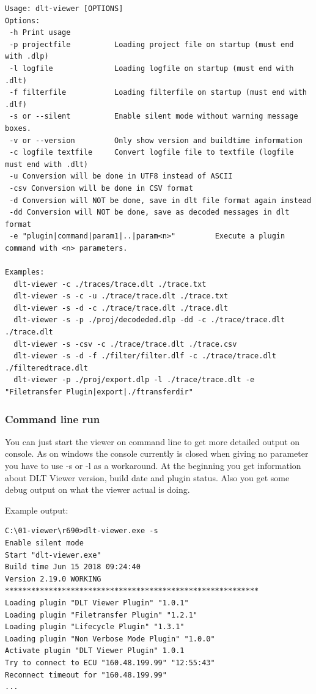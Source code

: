 \documentclass[a4paper,11pt]{article}
\begin{document}
\footnotesize\begin{verbatim}
Usage: dlt-viewer [OPTIONS]
Options:
 -h Print usage
 -p projectfile          Loading project file on startup (must end with .dlp)
 -l logfile              Loading logfile on startup (must end with .dlt)
 -f filterfile           Loading filterfile on startup (must end with .dlf)
 -s or --silent          Enable silent mode without warning message boxes.
 -v or --version         Only show version and buildtime information
 -c logfile textfile     Convert logfile file to textfile (logfile must end with .dlt)
 -u Conversion will be done in UTF8 instead of ASCII
 -csv Conversion will be done in CSV format
 -d Conversion will NOT be done, save in dlt file format again instead
 -dd Conversion will NOT be done, save as decoded messages in dlt format
 -e "plugin|command|param1|..|param<n>"         Execute a plugin command with <n> parameters.

Examples:
  dlt-viewer -c ./traces/trace.dlt ./trace.txt
  dlt-viewer -s -c -u ./trace/trace.dlt ./trace.txt
  dlt-viewer -s -d -c ./trace/trace.dlt ./trace.dlt
  dlt-viewer -s -p ./proj/decodeded.dlp -dd -c ./trace/trace.dlt ./trace.dlt
  dlt-viewer -s -csv -c ./trace/trace.dlt ./trace.csv
  dlt-viewer -s -d -f ./filter/filter.dlf -c ./trace/trace.dlt ./filteredtrace.dlt
  dlt-viewer -p ./proj/export.dlp -l ./trace/trace.dlt -e "Filetransfer Plugin|export|./ftransferdir"
\end{verbatim}
\normalsize

\subsubsection{Command line run}
You can just start the viewer on command line to get more detailed output on console.
As on windows the console currently is closed when giving no parameter you have to use -s or
-l as a workaround. At the beginning you get information about DLT Viewer version, build date and plugin status.
Also you get some debug output on what the viewer actual is doing.

Example output:

\begin{verbatim}
C:\01-viewer\r690>dlt-viewer.exe -s
Enable silent mode
Start "dlt-viewer.exe"
Build time Jun 15 2018 09:24:40
Version 2.19.0 WORKING
**********************************************************
Loading plugin "DLT Viewer Plugin" "1.0.1"
Loading plugin "Filetransfer Plugin" "1.2.1"
Loading plugin "Lifecycle Plugin" "1.3.1"
Loading plugin "Non Verbose Mode Plugin" "1.0.0"
Activate plugin "DLT Viewer Plugin" 1.0.1
Try to connect to ECU "160.48.199.99" "12:55:43"
Reconnect timeout for "160.48.199.99"
...
\end{verbatim}
\end{document}
